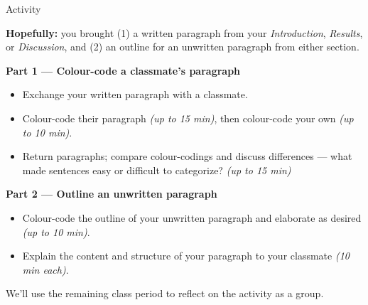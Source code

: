 \documentclass{beamer}
\begin{document}
\begin{frame}{Activity}

  \footnotesize
  \textbf{Hopefully:} you brought (1) a written paragraph from your
  \textit{Introduction}, \textit{Results}, or \textit{Discussion},
  and (2) an outline for an unwritten paragraph from either section.

  \medskip
  \textbf{Part 1 --- Colour-code a classmate's paragraph}
  \begin{itemize}
    \item Exchange your written paragraph with a classmate.
    \item Colour-code their paragraph \emph{(up to 15 min)}, then colour-code your own \emph{(up to 10 min)}.
    \item Return paragraphs; compare colour-codings and discuss differences ---
      what made sentences easy or difficult to categorize? \emph{(up to 15 min)}
  \end{itemize}

  \medskip
  \textbf{Part 2 --- Outline an unwritten paragraph}
  \begin{itemize}
    \item Colour-code the outline of your unwritten paragraph and
      elaborate as desired \emph{(up to 10 min)}.
    \item Explain the content and structure of your paragraph to your
      classmate \emph{(10 min each)}.
  \end{itemize}

  \medskip
  We'll use the remaining class period to reflect on the activity as a group.

\end{frame}
\end{document}
